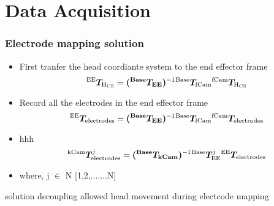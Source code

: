 \section{Data Acquisition}
\begin{frame}
	\frametitle{Electrode mapping solution}
	\begin{itemize}
		\item First tranfer the head coordiante system to the end effector frame
			\begin{equation*}
			{}^\mathrm{EE} \bm{T}_\mathrm{H_{CS}} = \bm{({}^\mathrm{Base} \bm{T}_\mathrm{EE})}^{-1} {}^\mathrm{Base} \bm{T}_\mathrm{fCam} {}^\mathrm{fCam} \bm{T}_\mathrm{H_{CS}}
			\end{equation*}
		\item Record all the electrodes in the end effector frame
			\begin{equation*}
			{}^\mathrm{EE} \bm{T}_\mathrm{electrodes} = \bm{({}^\mathrm{Base} \bm{T}_\mathrm{EE})}^{-1} {}^\mathrm{Base} \bm{T}_\mathrm{fCam} {}^\mathrm{fCam} \bm{T}_\mathrm{electrodes}
			\end{equation*} 
		  \item hhh
		  \begin{equation*}
		  {}^\mathrm{kCam} \bm{T}_\mathrm{electrodes}^j =
		   \bm{({}^\mathrm{Base} \bm{T}_\mathrm{kCam})}^{-1} {}^\mathrm{Base} \bm{T}_\mathrm{EE}^j
		   {}^\mathrm{EE} \bm{T}_\mathrm{electrodes}
			\end{equation*} 
			\item where, j $\in$ N [1,2,.......N]
	\end{itemize}
\begin{block}{solution}
	decoupling allowed head movement during electcode mapping
\end{block}
		
\end{frame}


